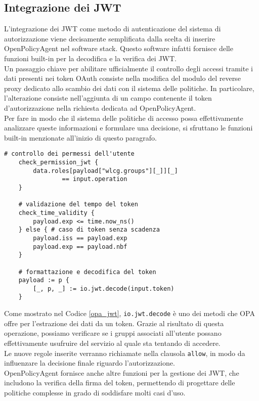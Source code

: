 \subsection{Integrazione dei JWT}
L'integrazione dei JWT come metodo di autenticazione del sistema di autorizzazione viene decisamente semplificata
dalla scelta di inserire OpenPolicyAgent nel software stack. 
Questo software infatti fornisce delle funzioni built-in per la decodifica e la verifica dei JWT.
\\ Un passaggio chiave per abilitare ufficialmente il controllo degli accessi tramite i dati presenti nei token OAuth
consiste nella modifica del modulo del reverse proxy dedicato allo scambio dei dati con il sistema delle politiche. In particolare, l'alterazione consiste 
nell'aggiunta di un campo contenente il token d'autorizzazione nella richiesta dedicata ad OpenPolicyAgent.
\\ Per fare in modo che il sistema delle politiche di accesso possa effettivamente analizzare queste informazioni e formulare una decisione, 
si sfruttano le funzioni built-in menzionate all'inizio di questo paragrafo. 
\begin{lstlisting}[caption={Esempio di regole per la gestione dei token OAuth 2.0},captionpos=b,label=opa_jwt]
    # controllo dei permessi dell'utente
    check_permission_jwt {
        data.roles[payload["wlcg.groups"][_]][_]
                == input.operation
    }
    
    # validazione del tempo del token 
    check_time_validity {
        payload.exp <= time.now_ns()
    } else { # caso di token senza scadenza
        payload.iss == payload.exp
        payload.exp == payload.nbf
    }
    
    # formattazione e decodifica del token
    payload := p {
        [_, p, _] := io.jwt.decode(input.token)
    }
\end{lstlisting}
Come mostrato nel Codice \ref{opa_jwt}, \texttt{io.jwt.decode} è uno dei metodi che OPA offre per l'estrazione dei dati da un token.
Grazie al risultato di questa operazione, possiamo verificare se i gruppi associati all'utente possano effettivamente usufruire del servizio al quale sta tentando di accedere.
\\ Le nuove regole inserite verranno richiamate nella clausola \texttt{allow}, in modo da influenzare la decisione finale riguardo l'autorizzazione. 
\\ OpenPolicyAgent fornisce anche altre funzioni per la gestione dei JWT, che includono la verifica della firma del token, 
permettendo di progettare delle politiche complesse in grado di soddisfare molti casi d'uso. 


